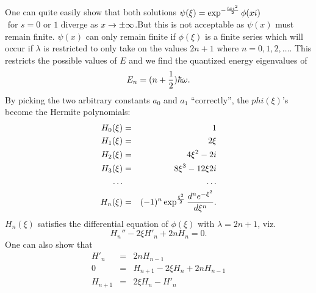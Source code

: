 One can quite easily show that both solutions $\displaystyle \psi(\xi) = \exp^{-{lxi^2\over2}}\phi(xi)$ $\mbox{ for } s=0 \mbox{ or } 1$ diverge as $x\rightarrow \pm \infty$.But this is not acceptable as $\psi(x)$ must remain finite.
$\psi(x)$ can only remain finite if $\phi(\xi)$ is a finite series which will occur if $\lambda$ is restricted to only take on the values $2n + 1$ where $n=0,1,2,\hdots$. This restricts the possible values of $E$ and we find
the quantized energy eigenvalues of $$E_n = (n + {1\over2})\hbar\omega.$$
By picking the two arbitrary constants $a_0$ and $a_1$ ``correctly'', the $phi(\xi)$'s become the Hermite polynomials:
\begin{eqnarray*}
H_0(\xi) &=& 1\\
H_1(\xi) &=& 2\xi\\
H_2(\xi) &=& 4\xi^2 - 2i\\
H_3(\xi) &=& 8\xi^3 - 12\xi2i\\
\hdots &\null& \hdots\\
H_n(\xi) &=& (-1)^n \exp^{{\xi^2\over 2}}{d^n e^{-\xi^2}\over d\xi^n}.
\end{eqnarray*}
$H_n(\xi)$ satisfies the differential equation of $\phi(\xi)$ with $\lambda = 2n+1$, viz. 
$$H_n'' - 2\xi H'_n + 2n H_n = 0.$$
One can also show that 
\begin{eqnarray*}
H'_n &=& 2n H_{n-1}\\
0 &=& H_{n+1} - 2\xi H_n + 2n H_{n-1}\\
H_{n+1} &=& 2\xi H_n - H'_n
\end{eqnarray*}